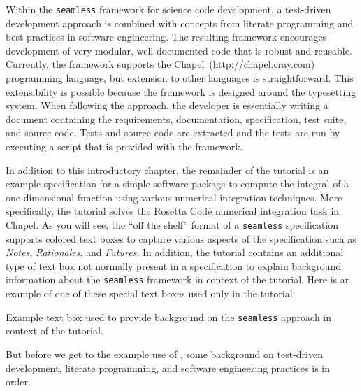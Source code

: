\label{Tutorial_Introduction}

Within the \lstinline{seamless} framework for science code development, a test-driven development approach
is combined with concepts from literate programming\cite{knuth} and 
best practices in software engineering. The resulting framework encourages development of very modular, 
well-documented code that is robust and reusable.  Currently, the framework supports 
the Chapel~(\url{http://chapel.cray.com}) programming language, but extension to other languages is 
straightforward.  This extensibility is possible because the framework is designed around the \latex
typesetting system. When following the \seamless approach, the developer is essentially writing a \latex
document containing the requirements, documentation, specification, test suite, and source code. Tests and 
source code are extracted and the tests are run by executing a script that is provided with the framework.

In addition to this introductory chapter, the remainder of the tutorial is an example \seamless 
specification for a simple software package
to compute the integral of a one-dimensional function using various numerical integration techniques. 
More specifically, the tutorial solves the Rosetta Code numerical integration 
task\cite{rosetta-code-numerical-integration} in Chapel. 
As you will
see, the ``off the shelf'' format of a \lstinline{seamless} specification supports colored text boxes to capture
various aspects of the specification such as \textit{Notes}, \textit{Rationales}, and \textit{Futures}. In addition,
the tutorial contains an additional type of text box not normally present in a specification to explain 
background information about the \lstinline{seamless} framework in context of the tutorial. Here is an example of one
of these special text boxes used only in the tutorial:
\begin{seamlessnote}
  Example text box used to provide background on the \lstinline{seamless} approach in context of the tutorial.
\end{seamlessnote}
But before we get to the example use of \seamless, some background on test-driven development, literate programming,
and software engineering practices is in order.

